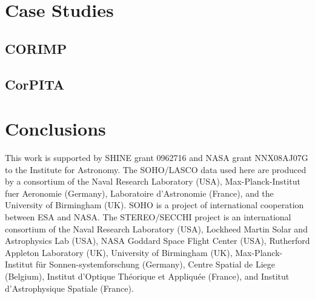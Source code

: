 \documentclass[structabstract]{aa}
\begin{document}
\section{Case Studies}
\label{sect:case_studies}

\subsection{CORIMP}
\label{subsect:corimp}

\subsection{CorPITA}
\label{subsect:corpita}

\section{Conclusions}
\label{sect:conclusions}


\begin{acknowledgements}
This work is supported by SHINE grant 0962716 and NASA grant NNX08AJ07G to the Institute for Astronomy. The SOHO/LASCO data used here are produced by a consortium of the Naval Research Laboratory (USA), Max-Planck-Institut fuer Aeronomie (Germany), Laboratoire d'Astronomie (France), and the University of Birmingham (UK). SOHO is a project of international cooperation between ESA and NASA. The STEREO/SECCHI project is an international consortium of the Naval Research Laboratory (USA), Lockheed Martin Solar and Astrophysics Lab (USA), NASA Goddard Space Flight Center (USA), Rutherford Appleton Laboratory (UK), University of Birmingham (UK), Max-Planck-Institut f\"{u}r Sonnen-systemforschung (Germany), Centre Spatial de Liege (Belgium), Institut d'Optique Th\'{e}orique et Appliqu\'{e}e (France), and Institut d'Astrophysique Spatiale (France). 
\end{acknowledgements}




  
\end{document}
